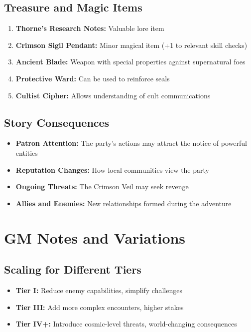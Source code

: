 \documentclass[11pt]{article}
\begin{document}
\subsection*{Treasure and Magic Items}
\begin{enumerate}[leftmargin=*]
\item \textbf{Thorne's Research Notes:} Valuable lore item
\item \textbf{Crimson Sigil Pendant:} Minor magical item (+1 to relevant skill checks)
\item \textbf{Ancient Blade:} Weapon with special properties against supernatural foes
\item \textbf{Protective Ward:} Can be used to reinforce seals
\item \textbf{Cultist Cipher:} Allows understanding of cult communications
\end{enumerate}

\subsection*{Story Consequences}
\begin{itemize}[leftmargin=*]
\item \textbf{Patron Attention:} The party's actions may attract the notice of powerful entities
\item \textbf{Reputation Changes:} How local communities view the party
\item \textbf{Ongoing Threats:} The Crimson Veil may seek revenge
\item \textbf{Allies and Enemies:} New relationships formed during the adventure
\end{itemize}

\section*{GM Notes and Variations}

\subsection*{Scaling for Different Tiers}
\begin{itemize}[leftmargin=*]
\item \textbf{Tier I:} Reduce enemy capabilities, simplify challenges
\item \textbf{Tier III:} Add more complex encounters, higher stakes
\item \textbf{Tier IV+:} Introduce cosmic-level threats, world-changing consequences
\end{itemize}
\end{document}
